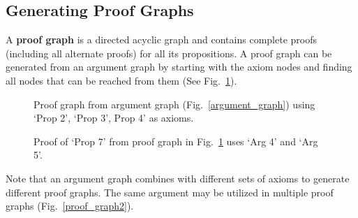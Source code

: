\documentclass[runningheads]{llncs}
\begin{document}
\subsection{Generating Proof Graphs}
A \textbf{proof graph} is a directed acyclic graph and contains complete proofs (including all alternate proofs) for all its propositions. A proof graph can be generated from an argument graph by starting with the axiom nodes and finding all nodes that can be reached from them (See Fig.~\ref{proof_graph1}).


\begin{figure}[!ht] 
\begin{center}
\caption{Proof graph from argument graph (Fig.~\ref{argument_graph}) using `Prop 2', `Prop 3', Prop 4' as axioms.}
\label{proof_graph1}
\end{center}
\end{figure}



\begin{figure}[!ht]
\begin{center}
\caption{Proof of `Prop 7' from proof graph in Fig.~\ref{proof_graph1} uses `Arg 4' and `Arg 5'.}
\label{proof_prop7}
\end{center}
\end{figure}

Note that an argument graph combines with different sets of axioms to generate different proof graphs. The same argument may be utilized in multiple proof graphs (Fig.~\ref{proof_graph2}).
\end{document}
